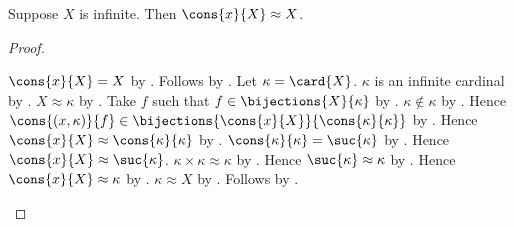 \begin{theorem}\label{infinite_cons_equinumerous}
    Suppose $X$ is infinite.
    Then $\cons{x}{X}\approx X$.
\end{theorem}
\begin{proof}
    \begin{byCase}
            $\cons{x}{X}=X$ by .
            Follows by .
            Let $\kappa=\card{X}$.
            $\kappa$ is an infinite cardinal
                by .
            $X\approx\kappa$ by .
            Take $f$ such that $f\in\bijections{X}{\kappa}$
                by .
            $\kappa\notin\kappa$ by .
            Hence $\cons{(x,\kappa)}{f}
                \in\bijections{\cons{x}{X}}{\cons{\kappa}{\kappa}}$
                by .
            Hence $\cons{x}{X}\approx\cons{\kappa}{\kappa}$
                by .
            $\cons{\kappa}{\kappa}=\suc{\kappa}$
                by .
            Hence $\cons{x}{X}\approx\suc{\kappa}$.
            $\kappa\times\kappa\approx\kappa$
                by .
            Hence $\suc{\kappa}\approx\kappa$
                by .
            Hence $\cons{x}{X}\approx\kappa$
                by .
            $\kappa\approx X$ by .
            Follows by .
    \end{byCase}
\end{proof}

